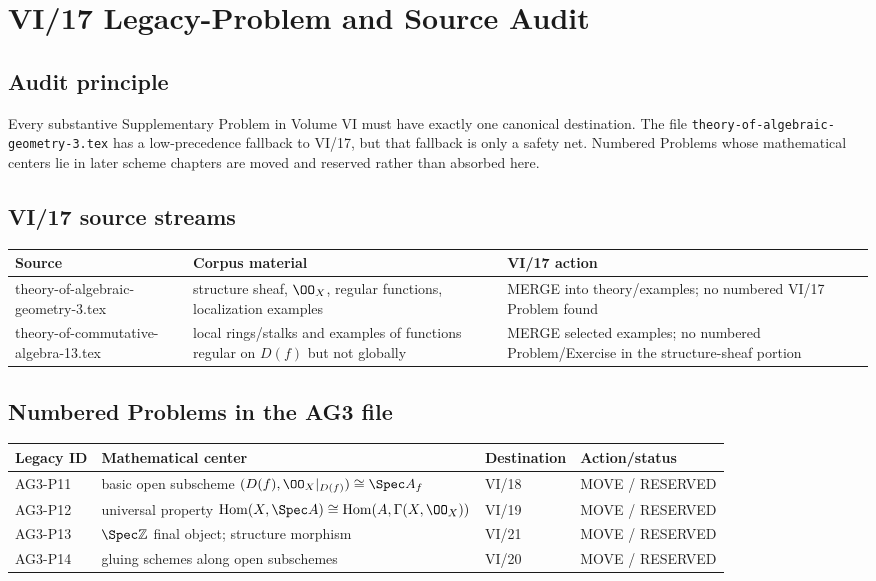 \chapter*{VI/17 Legacy-Problem and Source Audit}

\section*{Audit principle}
Every substantive Supplementary Problem in Volume VI must have exactly one canonical destination.
The file \texttt{theory-of-algebraic-geometry-3.tex} has a low-precedence fallback to VI/17,
but that fallback is only a safety net.  Numbered Problems whose mathematical centers lie in
later scheme chapters are moved and reserved rather than absorbed here.

\section*{VI/17 source streams}
\begin{center}
\begin{tabular}{p{}p{}p{}}
\toprule
Source & Corpus material & VI/17 action \\
\midrule
theory-of-algebraic-geometry-3.tex & structure sheaf, $\OO_X$, regular functions, localization examples & MERGE into theory/examples; no numbered VI/17 Problem found \\
\addlinespace
theory-of-commutative-algebra-13.tex & local rings/stalks and examples of functions regular on $D(f)$ but not globally & MERGE selected examples; no numbered Problem/Exercise in the structure-sheaf portion \\
\bottomrule
\end{tabular}
\end{center}

\section*{Numbered Problems in the AG3 file}
\begin{center}
\begin{tabular}{p{}p{}p{}p{}}
\toprule
Legacy ID & Mathematical center & Destination & Action/status \\
\midrule
AG3-P11 & basic open subscheme $(D(f),\OO_X|_{D(f)})\cong\Spec A_f$ & VI/18 & MOVE / RESERVED \\
AG3-P12 & universal property $\operatorname{Hom}(X,\Spec A)\cong\operatorname{Hom}(A,\Gamma(X,\OO_X))$ & VI/19 & MOVE / RESERVED \\
AG3-P13 & $\Spec\mathbb Z$ final object; structure morphism & VI/21 & MOVE / RESERVED \\
AG3-P14 & gluing schemes along open subschemes & VI/20 & MOVE / RESERVED \\
\bottomrule
\end{tabular}
\end{center}

